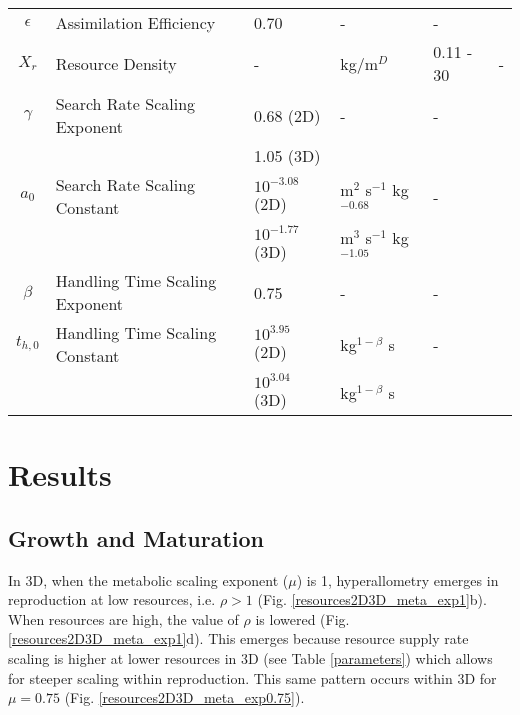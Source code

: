 \documentclass[a4paper, 11pt, hidelinks]{article} %
\begin{document}
\begin{centering}
\begin{table}[h!]
{\begin{tabular}{c p{3.9cm} l l l p{3cm}}
				$\epsilon$	& Assimilation Efficiency & 0.70 & - & - 		& \cite{Peters1983} \\
				$X_r$ 		& Resource Density		& -		& kg/m$^D$		& 0.11 - 30				& -\\
				$\gamma$	& Search Rate Scaling Exponent & 0.68 (2D)	& - & - & \cite{Pawar2012} \\
				&						& 1.05 (3D)\\
				$a_0$		& Search Rate Scaling Constant & $10^{-3.08}$ (2D) & m$^2$ s$^{-1}$ kg$^{-0.68}$   & - &\cite{Pawar2012}	\\
				&						& $10^{-1.77}$ (3D)& m$^3$ s$^{-1}$ kg$^{-1.05} $\\
				$\beta$		& Handling Time Scaling Exponent& 0.75 & - & - & \cite{Pawar2012}\\
				$t_{h, 0}$	& Handling Time Scaling Constant& $10^{3.95}$ (2D) &kg$^{1-\beta}$ s& -& \cite{Pawar2012}	\\
				&						& $10^{3.04}$ (3D)			&kg$^{1-\beta}$ s\\
				\hline
			\end{tabular}
		}%
		\end{table}
	\end{centering}

	\newpage

\section{Results}
	
	\subsection{Growth and Maturation}
	In 3D, when the metabolic scaling exponent ($ \mu $) is 1, hyperallometry emerges in reproduction at low resources, i.e. $ \rho > 1 $ (Fig. \ref{resources2D3D_meta_exp1}b).  When resources are high, the value of $ \rho $ is lowered (Fig. \ref{resources2D3D_meta_exp1}d).  This emerges because resource supply rate scaling is higher at lower resources in 3D (see Table \ref{parameters}) which allows for steeper scaling within reproduction.  This same pattern occurs within 3D for $ \mu = 0.75$ (Fig. \ref{resources2D3D_meta_exp0.75}).  
	
\end{document}
